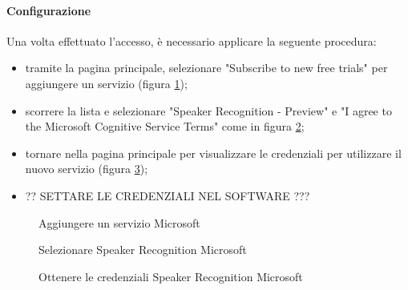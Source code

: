 \paragraph{Configurazione}
Una volta effettuato l'accesso, è necessario applicare la seguente procedura:
\begin{itemize}
	\item tramite la pagina principale, selezionare "Subscribe to new free trials" per aggiungere un servizio (figura \ref{fig:addMicrosoft});
	\item scorrere la lista e selezionare "Speaker Recognition - Preview" e "I agree to the Microsoft Cognitive Service Terms" come in figura \ref{fig:speakerRec};
	\item tornare nella pagina principale per visualizzare le credenziali per utilizzare il nuovo servizio (figura \ref{fig:credMicrosoft});
	\item ?? SETTARE LE CREDENZIALI NEL SOFTWARE ???
\end{itemize}
\begin{figure}[h]
	\caption{Aggiungere un servizio Microsoft}\label{fig:addMicrosoft}
\end{figure}
\begin{figure}[h]
	\caption{Selezionare Speaker Recognition Microsoft}\label{fig:speakerRec}
\end{figure}
\begin{figure}[h]
	\caption{Ottenere le credenziali Speaker Recognition Microsoft}\label{fig:credMicrosoft}
\end{figure}
